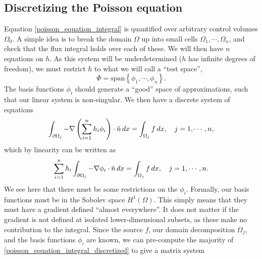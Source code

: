 \subsection{Discretizing the Poisson equation}\label{discretizing_poisson}
Equation \eqref{poisson_equation_integral} is quantified over arbitrary control volumes $\Omega_0$.
A simple idea is to break the domain $\Omega$ up into small cells $\Omega_1,\cdots,\Omega_n$, and check that the flux integral holds over each of these.
We will then have $n$ equations on $h$. As this system will be underdetermined ($h$ has infinite degrees of freedom), we must
restrict $h$ to what we will call a ``test space'',
    $$\Phi = \text{span}\left\{\phi_1,\cdots,\phi_n\right\}.$$
The basis functions $\phi_i$ should generate a ``good'' space of approximations,
such that our linear system is non-singular.
We then have a discrete system of equations
\begin{align*}
    \int_{{\partial\Omega}_j} -\nabla \left(\sum_{i=1}^n h_i\phi_i\right)\cdot \hat{n}\,dx = \int_{{\Omega}_j} f\,dx,\quad j=1,\cdots,n,
\end{align*}
which by linearity can be written as
\begin{equation}\label{poisson_equation_integral_discretized}
    \sum_{i=1}^n h_i\int_{{\partial\Omega}_j} -\nabla \phi_i \cdot \hat{n}\,dx = \int_{{\Omega}_j} f\,dx,\quad j=1,\cdots,n.
\end{equation}
We see here that there must be some restrictions on the $\phi_i$.
Formally, our basis functions must be in the Sobolev space $H^1(\Omega)$. This simply means that they must have a gradient defined ``almost everywhere''.
It does not matter if the gradient is not defined at isolated lower-dimensional subsets, as these make no contribution to
the integral. Since the source $f$, our domain decomposition $\Omega_j$, and the basis functions $\phi_i$ are known, we can pre-compute
the majority of \eqref{poisson_equation_integral_discretized} to give a matrix system


